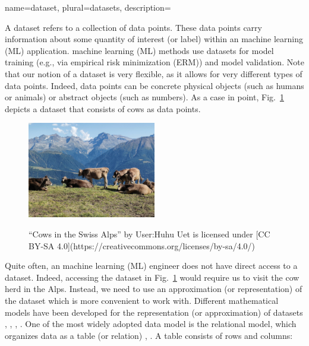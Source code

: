 {name={dataset}, plural={datasets},
	description={A dataset refers to a collection of data points. These 
		data points carry information about some quantity of interest (or label) within 
		an machine learning (ML) application. machine learning (ML) methods use datasets for model training (e.g., via empirical risk minimization (ERM))
		and model validation. Note that our notion of a dataset is very flexible, as 
		it allows for very different types of data points. Indeed, data points can be concrete 
		physical objects (such as humans or animals) or abstract objects (such as numbers). 
		As a case in point, Fig.\ \ref{fig_cows_dataset} depicts a dataset that consists of cows as 
		data points. 
		\begin{figure}[H]
				\begin{center}
		\label{fig:cowsintheswissalps}
		\includegraphics[width=0.5\textwidth]{assets/Cows_in_the_Swiss_Alps.jpg}
		  \end{center}
		\caption{\label{fig_cows_dataset}“Cows in the Swiss Alps” by User:Huhu Uet is licensed under [CC BY-SA 4.0](https://creativecommons.org/licenses/by-sa/4.0/)}
	  \end{figure}
       Quite often, an machine learning (ML) engineer does not have direct access to a dataset. Indeed, accessing the 
       dataset in Fig.\ \ref{fig_cows_dataset} would require us to visit the cow herd in the Alps. Instead, 
       we need to use an approximation (or representation) of the dataset which is more convenient 
       to work with. Different mathematical models have been developed for the representation (or approximation) 
       of datasets \cite{silberschatz2019database}, \cite{abiteboul1995foundations}, \cite{hoberman2009data}, \cite{ramakrishnan2002database}. 
       One of the most widely adopted data model is the relational model, which organizes data 
       as a table (or relation) \cite{codd1970relational}, \cite{silberschatz2019database}.
		A table consists of rows and columns:
		\begin{itemize} 

\end{itemize}}}

